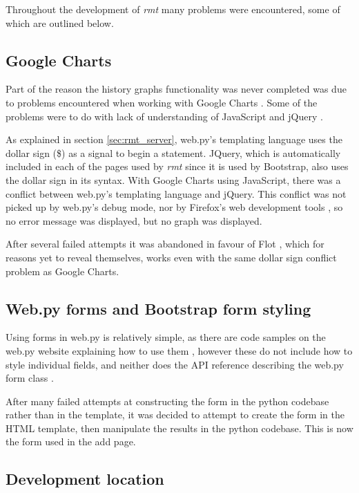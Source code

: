 Throughout the development of \emph{rmt} many problems were encountered, some of which are outlined below.

\subsection{Google Charts}

Part of the reason the history graphs functionality was never completed was due to problems encountered when working with Google Charts \citeyearpar{googlecharts}.
Some of the problems were to do with lack of understanding of JavaScript \citep{javascript} and jQuery \citep{jquery}.

As explained in section \ref{sec:rmt_server}, web.py's templating language uses the dollar sign (\$) as a signal to begin a statement.
JQuery, which is automatically included in each of the pages used by \emph{rmt} since it is used by Bootstrap, also uses the dollar sign in its syntax.
With Google Charts using JavaScript, there was a conflict between web.py's templating language and jQuery.
This conflict was not picked up by web.py's debug mode, nor by Firefox's web development tools \citep{firefoxdevtools}, so no error message was displayed, but no graph was displayed.

After several failed attempts it was abandoned in favour of Flot \citep{flot}, which for reasons yet to reveal themselves, works even with the same dollar sign conflict problem as Google Charts.

\subsection{Web.py forms and Bootstrap form styling}

Using forms in web.py is relatively simple, as there are code samples on the web.py website explaining how to use them \citep{webpyform, webpyformfields}, however these do not include how to style individual fields, and neither does the API reference describing the web.py form class \citep{webpyformclass}.

After many failed attempts at constructing the form in the python codebase rather than in the template, it was decided to attempt to create the form in the HTML template, then manipulate the results in the python codebase.
This is now the form used in the add page.

\subsection{Development location}

